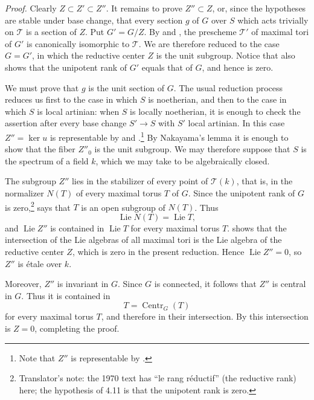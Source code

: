 \emph{Proof.}
Clearly \(Z\subset Z'\subset Z''\). It remains to prove
\(Z''\subset Z\), or, since the hypotheses are stable under base
change, that every section \(g\) of \(G\) over \(S\) which acts
trivially on \(\mathcal T\) is a section of \(Z\). Put \(G'=G/Z\).
By  and , the prescheme \(\mathcal T'\) of maximal tori of
\(G'\) is canonically isomorphic to \(\mathcal T\). We are therefore
reduced to the case \(G=G'\), in which the reductive center \(Z\) is
the unit subgroup. Notice that  also shows that the unipotent
rank of \(G'\) equals that of \(G\), and hence is zero.

We must prove that \(g\) is the unit section of \(G\). The usual
reduction process reduces us first to the case in which \(S\) is
noetherian, and then to the case in which \(S\) is local artinian:
when \(S\) is locally noetherian, it is enough to check the assertion
after every base change \(S'\to S\) with \(S'\) local artinian. In
this case \(Z''=\ker u\) is representable by  and .\footnote{Note that \(Z''\) is representable by
.} By Nakayama's
lemma it is enough to show that the fiber \(Z''_0\) is the unit
subgroup. We may therefore suppose that \(S\) is the spectrum of a
field \(k\), which we may take to be algebraically closed.

The subgroup \(Z''\) lies in the stabilizer of every point of
\(\mathcal T(k)\), that is, in the normalizer \(N(T)\) of every
maximal torus \(T\) of \(G\). Since the unipotent rank of \(G\) is
zero,\footnote{Translator's note: the 1970 text has ``le rang réductif''
(the reductive rank) here; the hypothesis of 4.11 is that the unipotent
rank is zero.}  says that \(T\) is an open subgroup of \(N(T)\). Thus
\[
  \operatorname{Lie}N(T)=\operatorname{Lie}T,
\]
and \(\operatorname{Lie}Z''\) is contained in
\(\operatorname{Lie}T\) for every maximal torus \(T\).  shows that the intersection of the Lie algebras of all maximal
tori is the Lie algebra of the reductive center \(Z\), which is zero
in the present reduction. Hence \(\operatorname{Lie}Z''=0\), so
\(Z''\) is étale over \(k\).

Moreover, \(Z''\) is invariant in \(G\). Since \(G\) is connected,
it follows that \(Z''\) is central in \(G\). Thus it is contained in
\[
  T=\operatorname{Centr}_G(T)
\]
for every maximal torus \(T\), and therefore in their intersection.
By  this intersection is \(Z=0\), completing the proof.

